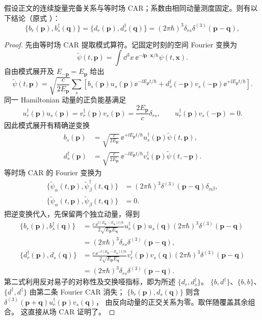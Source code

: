 \begin{proposition}
假设正文的连续旋量完备关系与等时场 CAR；系数由相同动量测度固定。则有以下结论（原式 ）：
\begin{equation*}
\boxed{
\{b_r(\mathbf p),b_s^\dagger(\mathbf q)\}
=\{d_r(\mathbf p),d_s^\dagger(\mathbf q)\}
=(2\pi\hbar)^3\delta_{rs}\delta^{(3)}(\mathbf p-\mathbf q),}
\end{equation*}
\end{proposition}
\begin{proof}
先由等时场 CAR 提取模式算符。记固定时刻的空间 Fourier 变换为
\[
\widetilde\psi(t,\mathbf p)
=\int\dd^3x\,\ee^{-\ii\mathbf p\cdot\mathbf x/\hbar}\psi(t,\mathbf x).
\]
自由模式展开及 $E_{-\mathbf p}=E_{\mathbf p}$ 给出
\[
\widetilde\psi(t,\mathbf p)
=\sqrt{\frac{c}{2E_{\mathbf p}}}
\sum_s\left[
b_s(\mathbf p)u_s(\mathbf p)\ee^{-\ii E_{\mathbf p}t/\hbar}
+d_s^\dagger(-\mathbf p)v_s(-\mathbf p)\ee^{+\ii E_{\mathbf p}t/\hbar}
\right].
\]
同一 Hamiltonian 动量的正负能基满足
\[
u_r^\dagger(\mathbf p)u_s(\mathbf p)
=v_r^\dagger(\mathbf p)v_s(\mathbf p)
=\frac{2E_{\mathbf p}}c\delta_{rs},
\qquad
u_r^\dagger(\mathbf p)v_s(-\mathbf p)=0.
\]
因此模式展开有精确逆变换
\begin{align*}
b_s(\mathbf p)
&=\sqrt{\frac{c}{2E_{\mathbf p}}}\,
\ee^{+\ii E_{\mathbf p}t/\hbar}
u_s^\dagger(\mathbf p)\widetilde\psi(t,\mathbf p),\\
d_s^\dagger(\mathbf p)
&=\sqrt{\frac{c}{2E_{\mathbf p}}}\,
\ee^{-\ii E_{\mathbf p}t/\hbar}
v_s^\dagger(\mathbf p)\widetilde\psi(t,-\mathbf p).
\end{align*}
等时场 CAR 的 Fourier 变换为
\begin{align*}
\{\widetilde\psi_\alpha(t,\mathbf p),
\widetilde\psi_\beta^\dagger(t,\mathbf q)\}
&=(2\pi\hbar)^3\delta^{(3)}(\mathbf p-\mathbf q)\delta_{\alpha\beta},\\
\{\widetilde\psi_\alpha(t,\mathbf p),
\widetilde\psi_\beta(t,\mathbf q)\}&=0.
\end{align*}
把逆变换代入，先保留两个独立动量，得到
\begin{align*}
\{b_r(\mathbf p),b_s^\dagger(\mathbf q)\}
&=\frac{c\,\ee^{\ii(E_{\mathbf p}-E_{\mathbf q})t/\hbar}}
{2\sqrt{E_{\mathbf p}E_{\mathbf q}}}
u_r^\dagger(\mathbf p)u_s(\mathbf q)
(2\pi\hbar)^3\delta^{(3)}(\mathbf p-\mathbf q)\\
&=(2\pi\hbar)^3\delta_{rs}\delta^{(3)}(\mathbf p-\mathbf q),\\
\{d_r^\dagger(\mathbf p),d_s(\mathbf q)\}
&=\frac{c\,\ee^{-\ii(E_{\mathbf p}-E_{\mathbf q})t/\hbar}}
{2\sqrt{E_{\mathbf p}E_{\mathbf q}}}
v_r^\dagger(\mathbf p)v_s(\mathbf q)
(2\pi\hbar)^3\delta^{(3)}(\mathbf p-\mathbf q)\\
&=(2\pi\hbar)^3\delta_{rs}\delta^{(3)}(\mathbf p-\mathbf q).
\end{align*}
第二式利用反对易子的对称性及交换哑指标，即为所述 $\{d_r,d_s^\dagger\}$。
$\{b,d^\dagger\}$、$\{b,b\}$、$\{d^\dagger,d^\dagger\}$ 由第二条 Fourier CAR 消失；
$\{b_r(\mathbf p),d_s(\mathbf q)\}$ 则含
$\delta^{(3)}(\mathbf p+\mathbf q)u_r^\dagger(\mathbf p)v_s(\mathbf q)$，
由反向动量的正交关系为零。取伴随覆盖其余组合。
这直接从场 CAR 证明了。


\end{proof}
